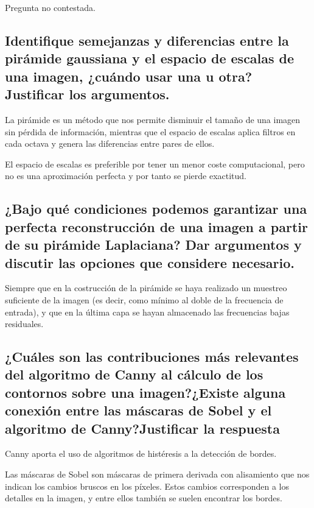 \documentclass[11pt]{scrartcl} %
\begin{document}
Pregunta no contestada.


\subsection{Identifique semejanzas y diferencias entre la pirámide gaussiana y
el espacio de escalas de una imagen, ¿cuándo usar una u otra? Justificar los 
argumentos.}


La pirámide es un método que nos permite disminuir el tamaño de una imagen sin 
pérdida de información, mientras que el espacio de escalas aplica filtros en 
cada octava y genera las diferencias entre pares de ellos.\newline

El espacio de escalas es preferible por tener un menor coste computacional, pero
no es una aproximación perfecta y por tanto se pierde exactitud.

\subsection{¿Bajo qué condiciones podemos garantizar una perfecta reconstrucción
de una imagen a partir de su pirámide Laplaciana? Dar argumentos y discutir las
opciones que considere necesario.}

Siempre que en la costrucción de la pirámide se haya realizado un muestreo 
suficiente de la imagen (es decir, 
como mínimo al doble de la frecuencia de entrada), y que en la última capa se
hayan almacenado las frecuencias bajas residuales.

\subsection{¿Cuáles son las contribuciones más relevantes del algoritmo de Canny
al cálculo de los contornos sobre una imagen?\newline¿Existe alguna conexión entre las
máscaras de Sobel y el algoritmo de Canny?\newline Justificar la respuesta}

Canny aporta el uso de algoritmos de histéresis a la detección de bordes.\newline

Las máscaras de Sobel son máscaras de primera derivada con alisamiento que nos 
indican los cambios bruscos en los píxeles. Estos cambios corresponden a los 
detalles en la imagen, y entre ellos también se suelen encontrar los bordes.
\end{document}
